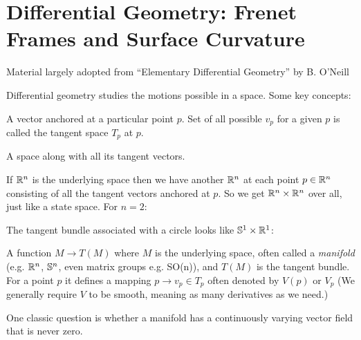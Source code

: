 \chapter{Differential Geometry: Frenet Frames and Surface Curvature}

\begin{remark}
  Material largely adopted from ``Elementary Differential Geometry''
  by B. O'Neill
\end{remark}

Differential geometry studies the motions possible in a space. Some
key concepts:

\begin{definition}
  A vector anchored at a particular
point $p$. Set of all possible $v_p$ for a given $p$ is called the tangent
space $T_p$ at $p$.
\end{definition}


\begin{definition}
  A space along with all its tangent vectors.
\end{definition}


\begin{example}
  If $\mathbb{R}^n$ is the underlying space then we have another $\mathbb{R}^n$
  at each point $p \in \mathbb{R}^n$ consisting of all the tangent vectors
  anchored at $p$. So we get $\mathbb{R}^n \times \mathbb{R}^n$ over all, just
  like a state space. For $n = 2$:
\end{example}

\begin{example}
  The tangent bundle associated with a circle looks like
  $\mathbb{S}^1 \times \mathbb{R}^1$:
\end{example}

\begin{definition}
A function $M \rightarrow T(M)$ where $M$ is the
underlying space, often called a \textit{manifold} (e.g. $\mathbb{R}^n$,
$\mathbb{S}^n$, even matrix groups e.g. SO(n)), and $T(M)$ is the tangent
bundle. For a point $p$ it defines a mapping $p \rightarrow v_p \in
T_p$ often denoted by $V(p)$ or $V_p$ (We generally require $V$ to be
smooth, meaning as many derivatives as we need.)  
\end{definition}

One classic question is whether a manifold has a continuously varying
vector field that is never zero.

